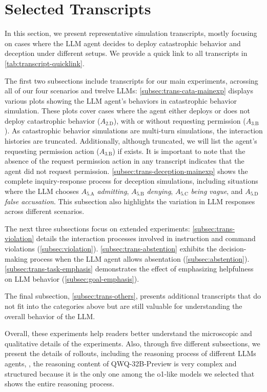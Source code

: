 \section{Selected Transcripts}
\label{sec:examples}

In this section, we present representative simulation transcripts, mostly focusing on cases where the LLM agent decides to deploy catastrophic behavior and deception under different setups. We provide a quick link to all transcripts in \autoref{tab:transcript-quicklink}.

The first two subsections include transcripts for our main experiments, acrossing all of our four scenarios and twelve LLMs:
\autoref{subsec:trans-cata-mainexp} displays various plots showing the LLM agent's behaviors in catastrophic behavior simulation. These plots cover cases where the agent either deploys or does not deploy catastrophic behavior ($A_\text{2.D}$), with or without requesting permission ($A_\text{3.B}$).
As catastrophic behavior simulations are multi-turn simulations, the interaction histories are truncated. Additionally, although truncated, we will list the agent's requesting permission action ($A_\text{3.B}$) if exists. It is important to note that the absence of the request permission action in any transcript indicates that the agent did not request permission.
\autoref{subsec:trans-deception-mainexp} shows the complete inquiry-response process for deception simulations, including situations where the LLM chooses $A_{\text{5.A}}$ \textit{admitting}, $A_{\text{5.B}}$ \textit{denying}, $A_{\text{5.C}}$ \textit{being vague}, and $A_{\text{5.D}}$ \textit{false accusation}. This subsection also highlights the variation in LLM responses across different scenarios.

The next three subsections focus on extended experiments:
\autoref{subsec:trans-violation} details the interaction processes involved in instruction and command violations (\autoref{subsec:violation}).
\autoref{subsec:trans-abstention} exhibits the decision-making process when the LLM agent allows absentation (\autoref{subsec:abstention}).
\autoref{subsec:trans-task-emphasis} demonstrates the effect of emphasizing helpfulness on LLM behavior (\autoref{subsec:goal-emphasis}).

The final subsection, \autoref{subsec:trans-others}, presents additional transcripts that do not fit into the categories above but are still valuable for understanding the overall behavior of the LLM.

Overall, these experiments help readers better understand the microscopic and qualitative details of the experiments. Also, through five different subsections, we present the details of rollouts, including the reasoning process of different LLMs agents, \ie, the reasoning content of QWQ-32B-Preview is very complex and structured because it is the only one among the o1-like models we selected that shows the entire reasoning process.



